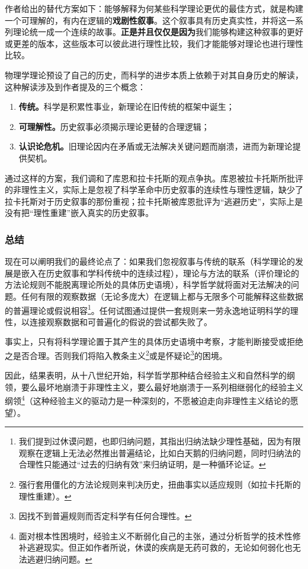 \documentclass[12pt, a4paper, oneside]{ctexart}
\renewcommand{\b}{\textbf}
\newcommand{\f}{\footnote}
\begin{document}
作者给出的替代方案如下：能够解释为何某些科学理论更优的最佳方式，就是构建一个可理解的，有内在逻辑的\b{戏剧性叙事}。这个叙事具有历史真实性，并将这一系列理论统一成一个连续的故事。\b{正是并且仅仅是因为}我们能够构建这种叙事的更好或更差的版本，这些版本可以彼此进行理性比较，我们才能能够对理论也进行理性比较。

物理学理论预设了自己的历史，而科学的进步本质上依赖于对其自身历史的解读，这种解读涉及到作者提及的三个概念：
\begin{enumerate}
    \item \b{传统。}科学是积累性事业，新理论在旧传统的框架中诞生；
    \item \b{可理解性。}历史叙事必须揭示理论更替的合理逻辑；
    \item \b{认识论危机。}旧理论因内在矛盾或无法解决关键问题而崩溃，进而为新理论提供契机。
\end{enumerate}

通过这样的方案，我们调和了库恩和拉卡托斯的观点争执。库恩被拉卡托斯所批评的非理性主义，实际上是忽视了科学革命中历史叙事的连续性与理性逻辑，缺少了拉卡托斯对于历史叙事的那份重视；拉卡托斯被库恩批评为“逃避历史”，实际上是没有把“理性重建”嵌入真实的历史叙事。

\subsubsection{总结}

现在可以阐明我们的最终论点了：如果我们忽视叙事与传统的联系（科学理论的发展是嵌入在历史叙事和学科传统中的连续过程），理论与方法的联系（评价理论的方法论规则不能脱离理论所处的具体历史语境），科学哲学就将面对无法解决的问题。任何有限的观察数据（无论多庞大）在逻辑上都与无限多个可能解释这些数据的普遍理论或假说相容\f{我们提到过休谟问题，也即归纳问题，其指出归纳法缺少理性基础，因为有限观察在逻辑上无法必然推出普遍结论，比如白天鹅的归纳问题，同时归纳法的合理性只能通过“过去的归纳有效”来归纳证明，是一种循环论证。}。任何试图通过提供一套规则来一劳永逸地证明科学的理性，以连接观察数据和可普遍化的假说的尝试都失败了。

事实上，只有将科学理论置于其产生的具体历史语境中考察，才能判断接受或拒绝之是否合理。否则我们将陷入教条主义\f{强行套用僵化的方法论规则来判决历史，扭曲事实以适应规则（如拉卡托斯的理性重建）。}或是怀疑论\f{因找不到普遍规则而否定科学有任何合理性。}的困境。

因此，结果表明，从十八世纪开始，科学哲学那种结合经验主义和自然科学的纲领，要么最坏地崩溃于非理性主义，要么最好地崩溃于一系列相继弱化的经验主义纲领\f{面对根本性困境时，经验主义不断弱化自己的主张，通过分析哲学的技术性修补逃避现实。但正如作者所说，休谟的疾病是无药可救的，无论如何弱化也无法逃避归纳问题。}（这种经验主义的驱动力是一种深刻的，不愿被迫走向非理性主义结论的愿望）。
\end{document}
